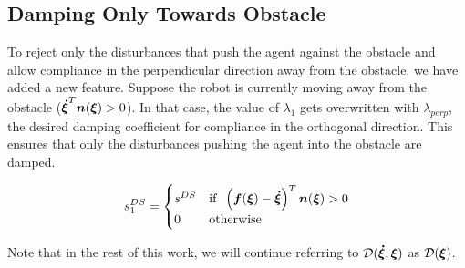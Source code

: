 \documentclass[conference]{IEEEtran}
\begin{document}

\subsection{Damping Only Towards Obstacle} \label{sec:damping_only_toward}
To reject only the disturbances that push the agent against the obstacle and allow compliance in the perpendicular direction away from the obstacle, we have added a new feature. Suppose the robot is currently moving away from the obstacle ($\boldsymbol{\dot\xi}^T \boldsymbol{n}(\boldsymbol{\xi}) > 0$). In that case, the value of $\lambda_1$ gets overwritten with $\lambda_{perp}$, the desired damping coefficient for compliance in the orthogonal direction. This ensures that only the disturbances pushing the agent into the obstacle are damped. 


\begin{equation}
  s_1^{DS} =
  \begin{cases}
    s^{DS} & \text{if} \;\; \left(\boldsymbol{f}(\boldsymbol{\xi}) - \boldsymbol{\dot \xi} \right)^T \boldsymbol{n}(\boldsymbol{\xi}) > 0 \\
    0 & \text{otherwise}
  \end{cases}
\end{equation}

Note that in the rest of this work, we will continue referring to $\mathcal{D}(\boldsymbol{\dot\xi}, \boldsymbol{\xi})$ as $\mathcal{D}(\boldsymbol{\xi})$.
\end{document}
